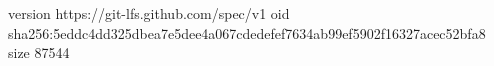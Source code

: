 version https://git-lfs.github.com/spec/v1
oid sha256:5eddc4dd325dbea7e5dee4a067cdedefef7634ab99ef5902f16327acec52bfa8
size 87544
